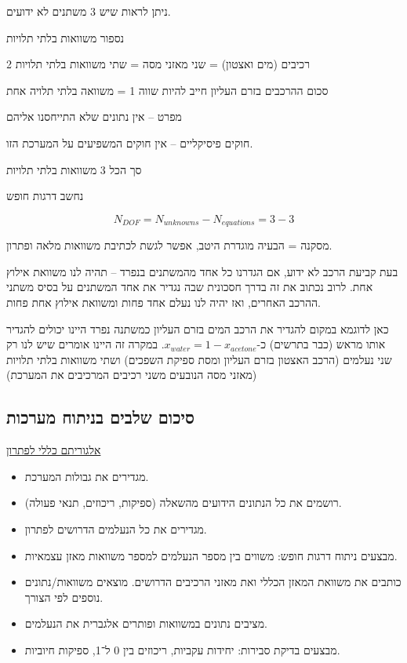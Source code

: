 \documentclass[
  hebrew,
  letterpaper,
  DIV=11,
  numbers=noendperiod]{scrreprt}
\begin{document}
ניתן לראות שיש 3 משתנים לא ידועים.

נספור משוואות בלתי תלויות

2 רכיבים (מים ואצטון) = שני מאזני מסה = שתי משוואות בלתי תלויות

סכום ההרכבים בזרם העליון חייב להיות שווה 1 = משוואה בלתי תלויה אחת

מפרט -- אין נתונים שלא התייחסנו אליהם

חוקים פיסיקליים -- אין חוקים המשפיעים על המערכת הזו.

סך הכל 3 משוואות בלתי תלויות

נחשב דרגות חופש

\[N_{DOF} = N_{unknowns} - N_{equations} = 3 - 3\]

מסקנה = הבעיה מוגדרת היטב, אפשר לגשת לכתיבת משוואות מלאה ופתרון.

בעת קביעת הרכב לא ידוע, אם הגדרנו כל אחד מהמשתנים בנפרד -- תהיה לנו
משוואת אילוץ אחת. לרוב נכתוב את זה בדרך חסכונית שבה נגדיר את אחד המשתנים
על בסיס משתני ההרכב האחרים, ואז יהיה לנו נעלם אחד פחות ומשוואת אילוץ אחת
פחות.

כאן לדוגמא במקום להגדיר את הרכב המים בזרם העליון כמשתנה נפרד היינו
יכולים להגדיר אותו מראש (כבר בתרשים) כ-\(x_{water} = 1 - x_{acetone}\).
במקרה זה היינו אומרים שיש לנו רק שני נעלמים (הרכב האצטון בזרם העליון
ומסת ספיקת השפכים) ושתי משוואות בלתי תלויות (מאזני מסה הנובעים משני
רכיבים המרכיבים את המערכת)

\subsection{סיכום שלבים בניתוח
מערכות}\label{ux5e1ux5d9ux5dbux5d5ux5dd-ux5e9ux5dcux5d1ux5d9ux5dd-ux5d1ux5e0ux5d9ux5eaux5d5ux5d7-ux5deux5e2ux5e8ux5dbux5d5ux5ea}

\ul{אלגוריתם כללי לפתרון}

\begin{itemize}
\item
  מגדירים את גבולות המערכת.
\item
  רושמים את כל הנתונים הידועים מהשאלה (ספיקות, ריכוזים, תנאי פעולה).
\item
  מגדירים את כל הנעלמים הדרושים לפתרון.
\item
  מבצעים ניתוח דרגות חופש: משווים בין מספר הנעלמים למספר משוואות מאזן
  עצמאיות.
\item
  כותבים את משוואת המאזן הכללי ואת מאזני הרכיבים הדרושים. מוצאים
  משוואות/נתונים נוספים לפי הצורך.
\item
  מציבים נתונים במשוואות ופותרים אלגברית את הנעלמים.
\item
  מבצעים בדיקת סבירות: יחידות עקביות, ריכוזים בין 0 ל־1, ספיקות חיוביות.
\end{itemize}
\end{document}
